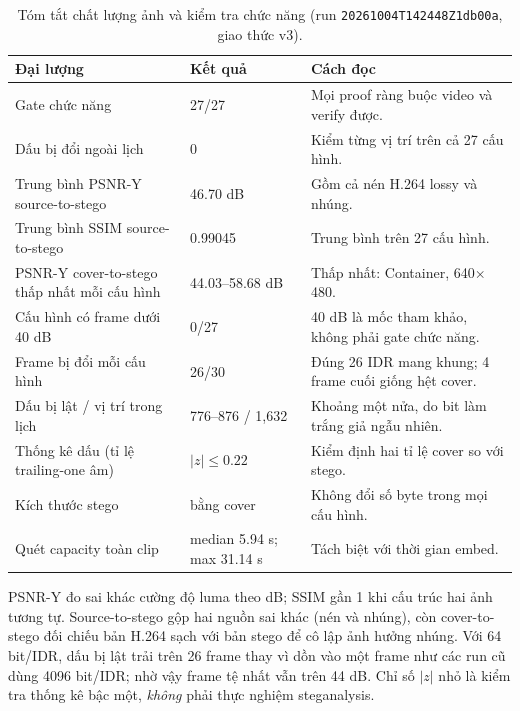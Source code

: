 \documentclass[11pt,a4paper]{article}
\renewcommand{\_}{\origunderscore\allowbreak}
\begin{document}
\begin{table}[H]\centering\small
\caption{Tóm tắt chất lượng ảnh và kiểm tra chức năng (run \texttt{20261004T142448Z\_1db00a}, giao thức v3).}
\begin{tabular}{p{6.2cm}p{3cm}p{4.8cm}}\toprule
Đại lượng & Kết quả & Cách đọc\\\midrule
Gate chức năng & 27/27 & Mọi proof ràng buộc video và verify được.\\
Dấu bị đổi ngoài lịch & 0 & Kiểm từng vị trí trên cả 27 cấu hình.\\
Trung bình PSNR-Y source-to-stego & 46.70 dB & Gồm cả nén H.264 lossy và nhúng.\\
Trung bình SSIM source-to-stego & 0.99045 & Trung bình trên 27 cấu hình.\\
PSNR-Y cover-to-stego thấp nhất mỗi cấu hình & 44.03--58.68 dB & Thấp nhất: Container, 640$\times$480.\\
Cấu hình có frame dưới 40 dB & 0/27 & 40 dB là mốc tham khảo, không phải gate chức năng.\\
Frame bị đổi mỗi cấu hình & 26/30 & Đúng 26 IDR mang khung; 4 frame cuối giống hệt cover.\\
Dấu bị lật / vị trí trong lịch & 776--876 / 1,632 & Khoảng một nửa, do bit làm trắng giả ngẫu nhiên.\\
Thống kê dấu (tỉ lệ trailing-one âm) & $|z|\le0.22$ & Kiểm định hai tỉ lệ cover so với stego.\\
Kích thước stego & bằng cover & Không đổi số byte trong mọi cấu hình.\\
Quét capacity toàn clip & median 5.94 s; max 31.14 s & Tách biệt với thời gian embed.\\
\bottomrule\end{tabular}
\end{table}
PSNR-Y đo sai khác cường độ luma theo dB; SSIM gần 1 khi cấu trúc hai ảnh tương tự. Source-to-stego gộp hai nguồn sai khác (nén và nhúng), còn cover-to-stego đối chiếu bản H.264 sạch với bản stego để cô lập ảnh hưởng nhúng. Với 64 bit/IDR, dấu bị lật trải trên 26 frame thay vì dồn vào một frame như các run cũ dùng 4096 bit/IDR; nhờ vậy frame tệ nhất vẫn trên 44 dB. Chỉ số $|z|$ nhỏ là kiểm tra thống kê bậc một, \emph{không} phải thực nghiệm steganalysis.
\end{document}
